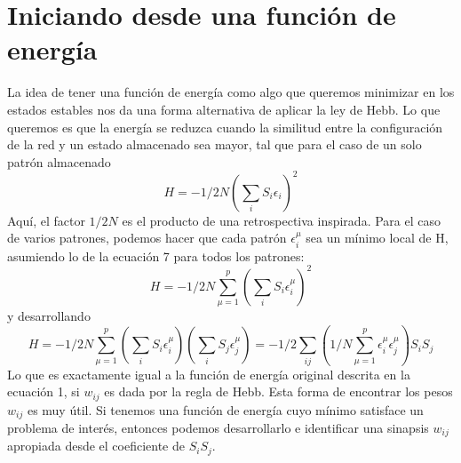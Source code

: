 \documentclass{article}
\begin{document}
\section{Iniciando desde una función de energía}
La idea de tener una función de energía como algo que queremos minimizar en los estados estables nos da una forma alternativa de aplicar la ley de Hebb. Lo que queremos es que la energía se reduzca cuando la similitud entre la configuración de la red y un estado almacenado sea mayor, tal que para el caso de un solo patrón almacenado
\begin{equation}
    H = - 1/2N (\sum_i S_{i}\epsilon_i)^{2}
    \label{2.29}
\end{equation}
Aquí, el factor $1/2N$ es el producto de una retrospectiva inspirada. Para el caso de varios patrones, podemos hacer que cada patrón $\epsilon_i^\mu$ sea un mínimo local de H, asumiendo lo de la ecuación 7 para todos los patrones:
\begin{equation}
    H = - 1/2N \sum_{\mu=1}^p(\sum_i S_{i}\epsilon_i^\mu)^{2}
    \label{2.30}
\end{equation}
y desarrollando
\begin{equation}
    H = - 1/2N \sum_{\mu=1}^p(\sum_i S_{i}\epsilon_i^\mu)(\sum_i S_{j}\epsilon_j^\mu) = - 1/2 \sum_{ij}(1/N\sum_{\mu=1}^p \epsilon_i^\mu\epsilon_j^\mu)S_iS_j
    \label{2.31}
\end{equation}
Lo que es exactamente igual a la función de energía original descrita en la ecuación 1, si $w_{ij}$ es dada por la regla de Hebb. 
Esta forma de encontrar los pesos $w_{ij}$ es muy útil. Si tenemos una función de energía cuyo mínimo satisface un problema de interés, entonces podemos desarrollarlo e identificar una sinapsis $w_{ij}$ apropiada desde el coeficiente de $S_iS_j$.
\end{document}
